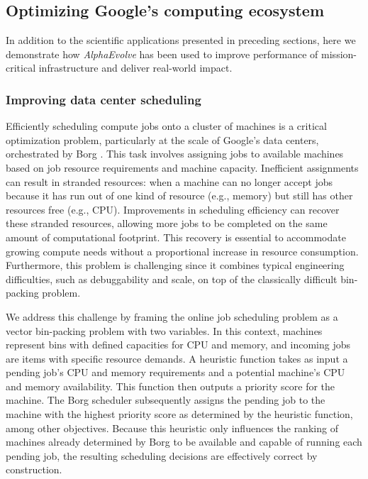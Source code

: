 \documentclass[logo,copyright,12pt]{googledeepmind}
\theoremstyle{definition}
\theoremstyle{remark}
\theoremstyle{plain}
\newcommand{\method}{\emph{AlphaEvolve}\xspace}
\begin{document}
\subsection{Optimizing Google's computing ecosystem}

In addition to the scientific applications presented in preceding sections, here we demonstrate how \method has been used to improve performance of mission-critical infrastructure and deliver real-world impact.

\subsubsection{Improving data center scheduling}

Efficiently scheduling compute jobs onto a cluster of machines is a critical optimization problem, particularly at the scale of Google's data centers, orchestrated by Borg \cite{43438}. This task involves assigning jobs to available machines based on job resource requirements and machine capacity. Inefficient assignments can result in stranded resources: when a machine can no longer accept jobs because it has run out of one kind of resource (e.g., memory) but still has other resources free (e.g., CPU). Improvements in scheduling efficiency can recover these stranded resources, allowing more jobs to be completed on the same amount of computational footprint. This recovery is essential to accommodate growing compute needs without a proportional increase in resource consumption. Furthermore, this problem is challenging since it combines typical engineering difficulties, such as debuggability and scale, on top of the classically difficult bin-packing problem.

We address this challenge by framing the online job scheduling problem as a vector bin-packing problem with two variables. In this context, machines represent bins with defined capacities for CPU and memory, and incoming jobs are items with specific resource demands. A heuristic function takes as input a pending job’s CPU and memory requirements and a potential machine’s CPU and memory availability. This function then outputs a priority score for the machine. The Borg scheduler subsequently assigns the pending job to the machine with the highest priority score as determined by the heuristic function, among other objectives. Because this heuristic only influences the ranking of machines already determined by Borg to be available and capable of running each pending job, the resulting scheduling decisions are effectively correct by construction.
\end{document}
